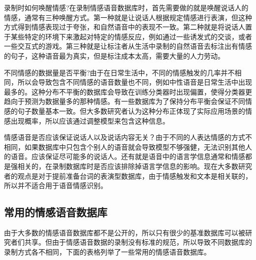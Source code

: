 录制时如何唤醒情感?在录制情感语音数据库时，首先需要做的就是唤醒说话人的情感，通常有三种唤醒方式。第一种就是让说话人根据规定情感进行表演，但这种方式得到情感表现过于夸张，和自然语音中的表现不一致。第二种就是将说话人置于某些特定的环境下来激起对特定的情感反应，例如通过一些诱发式的交谈，或者一些交互式的游戏。第三种就是让标注者从生活中录制的自然语音去标注出有情感的句子，这种语音最为真实，但是标注成本太高，需要大量的人力劳动。

不同情感的数据量是否平衡?由于在日常生活中，不同的情感触发的几率并不相同，所以会导致包含不同情感的语音数量也不同，例如中性语音是日常生活中出现最多的。这种分布不平衡的数据库会导致在训练分类器时出现偏置，使得分类器更趋向于预测为数据量多的那种情感。有一些数据库为了保持分布平衡会保证不同情感的句子数量基本一致。但大多数研究者认为这种分布正体现了实际应用场景的情感出现概率，所以应该通过调整模型来包含这种信息。

情感语音是否应该保证说话人以及说话内容无关？由于不同的人表达情感的方式不相同，如果数据库中只包含个别人的语音就会导致模型不够强健，无法识别其他人的语音。应该保证尽可能多的说话人。还有就是语音中的语言学信息通常和情感都是强相关的，在录制数据库时是否应该排除掉语言学信息的影响。现在大多数研究者的观点是对于提前准备台词的表演型数据库，由于情感触发和文本是相关联的，所以并不适合用于语音情感识别。

\subsection{常用的情感语音数据库}
\label{ssec:available_database}
由于大多数的情感语音数据库都不是公开的，所以只有很少的基准数据库可以被研究者们共享。但由于情感语音数据的录制没有标准的规范，所以导致不同数据库的录制方式各不相同，下面的表格列举了一些常用的情感语音数据库。

